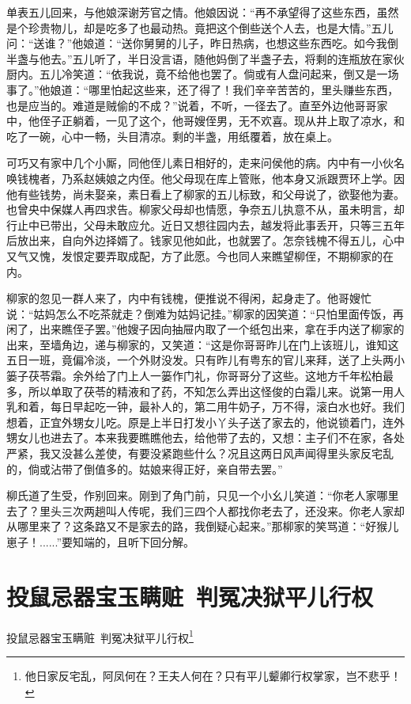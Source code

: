 \documentclass[12pt,oneside]{book}
\begin{document}
单表五儿回来，与他娘深谢芳官之情。他娘因说：“再不承望得了这些东西，虽然是个珍贵物儿，却是吃多了也最动热。竟把这个倒些送个人去，也是大情。”五儿问：“送谁？”他娘道：“送你舅舅的儿子，昨日热病，也想这些东西吃。如今我倒半盏与他去。”五儿听了，半日没言语，随他妈倒了半盏子去，将剩的连瓶放在家伙厨内。五儿冷笑道：“依我说，竟不给他也罢了。倘或有人盘问起来，倒又是一场事了。”他娘道：“哪里怕起这些来，还了得了！我们辛辛苦苦的，里头赚些东西，也是应当的。难道是贼偷的不成？”说着，不听，一径去了。直至外边他哥哥家中，他侄子正躺着，一见了这个，他哥嫂侄男，无不欢喜。现从井上取了凉水，和吃了一碗，心中一畅，头目清凉。剩的半盏，用纸覆着，放在桌上。

可巧又有家中几个小厮，同他侄儿素日相好的，走来问侯他的病。内中有一小伙名唤钱槐者，乃系赵姨娘之内侄。他父母现在库上管账，他本身又派跟贾环上学。因他有些钱势，尚未娶亲，素日看上了柳家的五儿标致，和父母说了，欲娶他为妻。也曾央中保媒人再四求告。柳家父母却也情愿，争奈五儿执意不从，虽未明言，却行止中已带出，父母未敢应允。近日又想往园内去，越发将此事丢开，只等三五年后放出来，自向外边择婿了。钱家见他如此，也就罢了。怎奈钱槐不得五儿，心中又气又愧，发恨定要弄取成配，方了此愿。今也同人来瞧望柳侄，不期柳家的在内。

柳家的忽见一群人来了，内中有钱槐，便推说不得闲，起身走了。他哥嫂忙说：“姑妈怎么不吃茶就走？倒难为姑妈记挂。”柳家的因笑道：“只怕里面传饭，再闲了，出来瞧侄子罢。”他嫂子因向抽屉内取了一个纸包出来，拿在手内送了柳家的出来，至墙角边，递与柳家的，又笑道：“这是你哥哥昨儿在门上该班儿，谁知这五日一班，竟偏冷淡，一个外财没发。只有昨儿有粤东的官儿来拜，送了上头两小篓子茯苓霜。余外给了门上人一篓作门礼，你哥哥分了这些。这地方千年松柏最多，所以单取了茯苓的精液和了药，不知怎么弄出这怪俊的白霜儿来。说第一用人乳和着，每日早起吃一钟，最补人的，第二用牛奶子，万不得，滚白水也好。我们想着，正宜外甥女儿吃。原是上半日打发小丫头子送了家去的，他说锁着门，连外甥女儿也进去了。本来我要瞧瞧他去，给他带了去的，又想：主子们不在家，各处严紧，我又没甚么差使，有要没紧跑些什么？况且这两日风声闻得里头家反宅乱的，倘或沾带了倒值多的。姑娘来得正好，亲自带去罢。”

柳氏道了生受，作别回来。刚到了角门前，只见一个小幺儿笑道：“你老人家哪里去了？里头三次两趟叫人传呢，我们三四个人都找你老去了，还没来。你老人家却从哪里来了？这条路又不是家去的路，我倒疑心起来。”那柳家的笑骂道：“好猴儿崽子！......”要知端的，且听下回分解。



\chapter{投鼠忌器宝玉瞒赃~判冤决狱平儿行权}
投鼠忌器宝玉瞒赃~判冤决狱平儿行权\footnote{他日家反宅乱，阿凤何在？王夫人何在？只有平儿颦卿行权掌家，岂不悲乎！}
\end{document}
